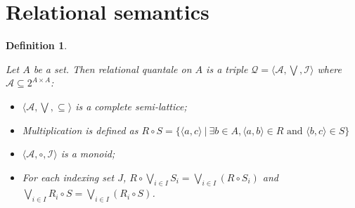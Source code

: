 \documentclass[a4paper]{article}
\theoremstyle{defin}
\newtheorem{defin}{Definition}
\theoremstyle{theorem}
\theoremstyle{prop}
\theoremstyle{lemma}
\theoremstyle{ex}
\theoremstyle{col}
\begin{document}
\begin{comment}
\begin{prooftree}
  \AxiomC{$f : \Gamma \otimes (F_s A \otimes B \otimes F_s A) \otimes \Delta \rightarrow C$}
  \UnaryInfC{$(id_{\Gamma} \otimes {c_A}_{s}^r \otimes id_{\Delta}) \circ f: \Gamma \otimes (B \otimes F_s A) \otimes \Delta \rightarrow C$}
\end{prooftree}

\begin{prooftree}
  \AxiomC{$f : \Gamma \otimes (\Delta \otimes F_s A) \otimes \Theta \rightarrow B$}
  \UnaryInfC{$(id_{\Gamma} \otimes (id_{\Delta} \otimes {e_A}_{s}) \otimes id_{\Theta}) \circ f: \Gamma \otimes (F_s A \otimes \Delta) \otimes \Theta \rightarrow B$}
\end{prooftree}

\begin{prooftree}
  \AxiomC{$f : \Gamma \otimes (F_s A \otimes \Delta) \otimes \Theta \rightarrow B$}
  \UnaryInfC{$(id_{\Gamma} \otimes (id_{\Delta} \otimes {e_A}_{s}^{-1}) \otimes id_{\Theta}) \circ f: \Gamma \otimes (\Delta \otimes F_s A) \otimes \Theta \rightarrow B$}
\end{prooftree}

    \item Completeness:

\begin{defin}
\end{defin}

  \end{itemize}
\end{proof}

\end{comment}

\section{Relational semantics}

\begin{defin}
  $ $

  Let $A$ be a set. Then relational quantale on $A$ is a triple $\mathcal{Q} = \langle \mathcal{A}, \bigvee, \mathcal{I}
  \rangle$ where $\mathcal{A} \subseteq 2^{A \times A}$:

  \begin{itemize}
    \item $\langle \mathcal{A}, \bigvee, \subseteq \rangle$ is a complete semi-lattice;
    \item Multiplication is defined as
      $R \circ S = \{ \langle a, c \rangle \: | \: \exists b \in A, \langle a, b \rangle \in R \text{ and } \langle b, c \rangle \in S\}$
    \item $\langle \mathcal{A}, \circ, \mathcal{I} \rangle$ is a monoid;
    \item For each indexing set $J$, $R \circ \bigvee_{i \in I} S_i = \bigvee_{i \in I} (R \circ S_i)$ and
      $\bigvee_{i \in I} R_i \circ S = \bigvee_{i \in I}(R_i \circ S)$.
  \end{itemize}
\end{defin}
\end{document}

